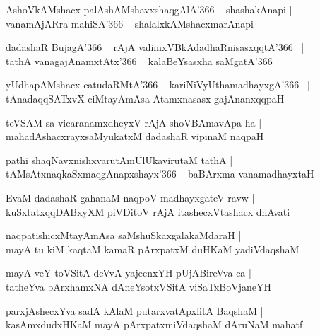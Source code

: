 \documentclass[twoside,12pt,openright]{book}
\newcounter{shloka}[chapter]
\begin{document}
\begin{shloka}%
AshoVkAMshacx palAshAMshavxshaqgAlA\char'366 ~ shashakAnapi |\\
vanamAjARra mahiSA\char'366 ~ shalalxkAMshacxmarAnapi 
\end{shloka}

\begin{shloka}%
dadashaR BujagA\char'366 ~ rAjA valimxVBkAdadhaRnisasxqqtA\char'366 ~|\\
tathA vanagajAnamxtAtx\char'366 ~ kalaBeYsasxha saMgatA\char'366
\end{shloka}

\begin{shloka}%
yUdhapAMshacx catudaRMtA\char'366 ~ kariNiVyUthamadhayxgA\char'366 ~|\\
tAnadaqqSATxvX ciMtayAmAsa Atamxnasasx gajAnanxqqpaH 
\end{shloka}

\begin{shloka}%
teVSAM sa vicaranamxdheyxV rAjA shoVBAmavApa ha |\\
mahadAshacxrayxsaMyukatxM dadashaR vipinaM naqpaH 
\end{shloka}

\begin{shloka}%
pathi shaqNavxnishxvarutAmUlUkavirutaM tathA |\\
tAMsAtxnaqkaSxmaqgAnapxshayx\char'366 ~ baBArxma vanamadhayxtaH
\end{shloka}

\begin{shloka}%
EvaM dadashaR gahanaM naqpoV madhayxgateV ravw |\\
kuSxtatxqqDABxyXM piVDitoV rAjA itashecxVtashacx dhAvati
\end{shloka}

\begin{shloka}%
naqpatishicxMtayAmAsa saMshuSkaxgalakaMdaraH |\\
mayA tu kiM kaqtaM kamaR pArxpatxM duHKaM yadiVdaqshaM 
\end{shloka}

\begin{shloka}%
mayA veY toVSitA deVvA yajecnxYH pUjABireVva ca |\\
tatheYva bArxhamxNA dAneYsotxVSitA viSaTxBoVjaneYH
\end{shloka}

\begin{shloka}%
parxjAshecxYva sadA kAlaM putarxvatApxlitA BaqshaM |\\
kasAmxdudxHKaM mayA pArxpatxmiVdaqshaM dAruNaM mahatf
\end{shloka}
\end{document}
